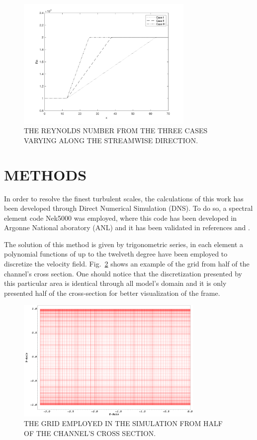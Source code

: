 \documentclass[twocolumn,10pt]{asme2e}
\begin{document}
\begin{figure}[!htbp]
	\centering
	\includegraphics[trim = 20mm 15mm 30mm 10mm, width = 85mm]{Re_across_x.png}
	\caption{THE REYNOLDS NUMBER FROM THE THREE CASES VARYING ALONG THE STREAMWISE DIRECTION.}
	\label{fig:reynolds_n}
\end{figure}

\section*{METHODS}

In order to resolve the finest turbulent scales, the calculations of this work has been developed through Direct Numerical Simulation (DNS). To do so, a spectral element code Nek5000 was employed, where this code has been developed in Argonne National aboratory (ANL) and it has been validated in references \cite{merzari2013} and \cite{Obabko2011}.

The solution of this method is given by trigonometric series, in each element a polynomial functions of up to the twelveth degree have been employed to discretize the velocity field. Fig.~\ref{fig:cross_grid} shows an example of the grid from half of the channel's cross section. One should notice that the discretization presented by this particular area is identical through all model's domain and it is only presented half of the cross-section for better visualization of the frame.

\begin{figure}[!htbp]
\begin{center}
\setlength{\unitlength}{0.012500in}%
  \includegraphics[trim = 20mm 15mm 20mm 10mm, width = 90mm]{half_cross_section_mesh.png}
\end{center}
  \caption{THE GRID EMPLOYED IN THE SIMULATION FROM HALF OF THE CHANNEL'S CROSS SECTION.}
  \label{fig:cross_grid}
\end{figure}
\end{document}
